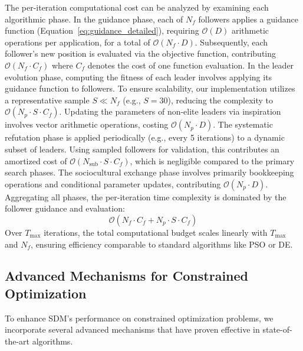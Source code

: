 \documentclass[11pt]{article}
\begin{document}
The per-iteration computational cost can be analyzed by examining each algorithmic phase. In the guidance phase, each of $N_f$ followers applies a guidance function (Equation~\ref{eq:guidance_detailed}), requiring $\mathcal{O}(D)$ arithmetic operations per application, for a total of $\mathcal{O}(N_f \cdot D)$. Subsequently, each follower's new position is evaluated via the objective function, contributing $\mathcal{O}(N_f \cdot C_f)$ where $C_f$ denotes the cost of one function evaluation.
In the leader evolution phase, computing the fitness of each leader involves applying its guidance function to followers. To ensure scalability, our implementation utilizes a representative sample $S \ll N_f$ (e.g., $S=30$), reducing the complexity to $\mathcal{O}(N_p \cdot S \cdot C_f)$. Updating the parameters of non-elite leaders via inspiration involves vector arithmetic operations, costing $\mathcal{O}(N_p \cdot D)$.
The systematic refutation phase is applied periodically (e.g., every 5 iterations) to a dynamic subset of leaders. Using sampled followers for validation, this contributes an amortized cost of $\mathcal{O}(N_{\text{sub}} \cdot S \cdot C_f)$, which is negligible compared to the primary search phases.
The sociocultural exchange phase involves primarily bookkeeping operations and conditional parameter updates, contributing $\mathcal{O}(N_p \cdot D)$.
Aggregating all phases, the per-iteration time complexity is dominated by the follower guidance and evaluation:
\begin{equation}
\mathcal{O}(N_f \cdot C_f + N_p \cdot S \cdot C_f)
\end{equation}
Over $T_{\max}$ iterations, the total computational budget scales linearly with $T_{\max}$ and $N_f$, ensuring efficiency comparable to standard algorithms like PSO or DE.


\subsection{Advanced Mechanisms for Constrained Optimization}
\label{sec:advanced_mechanisms}

To enhance SDM's performance on constrained optimization problems, we incorporate several advanced mechanisms that have proven effective in state-of-the-art algorithms.
\end{document}
